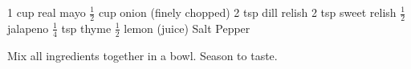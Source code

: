 \dishtype{\sauce}
\dishother{\vegetarian}
\begin{ingreds}
    1 cup real mayo
    $\frac{1}{2}$ cup onion (finely chopped)
    2 tsp dill relish
    2 tsp sweet relish
    $\frac{1}{2}$ jalapeno 
    $\frac{1}{4}$ tsp thyme
    $\frac{1}{2}$ lemon (juice)
    Salt
    Pepper
\end{ingreds}
\begin{method}
    Mix all ingredients together in a bowl.
    Season to taste.
\end{method}